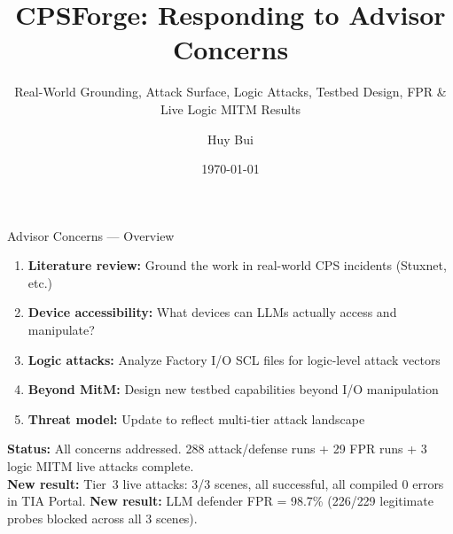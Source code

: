 \documentclass[aspectratio=169,10pt]{beamer}
\title{\textbf{CPSForge: Responding to Advisor Concerns}}
\subtitle{Real-World Grounding, Attack Surface, Logic Attacks, Testbed Design, FPR \& Live Logic MITM Results}
\author{Huy Bui}
\date{\today}
\begin{document}
\begin{frame}
\titlepage
\end{frame}

\begin{frame}{Advisor Concerns — Overview}
\begin{enumerate}
    \item \textbf{Literature review:} Ground the work in real-world CPS incidents (Stuxnet, etc.)
    \item \textbf{Device accessibility:} What devices can LLMs actually access and manipulate?
    \item \textbf{Logic attacks:} Analyze Factory I/O SCL files for logic-level attack vectors
    \item \textbf{Beyond MitM:} Design new testbed capabilities beyond I/O manipulation
    \item \textbf{Threat model:} Update to reflect multi-tier attack landscape
\end{enumerate}

\vspace{0.5em}
\textbf{Status:} All concerns addressed. 288 attack/defense runs + 29 FPR runs + 3 logic MITM live attacks complete.\\  
\textbf{New result:} Tier~3 live attacks: 3/3 scenes, all successful, all compiled 0 errors in TIA Portal.
\textbf{New result:} LLM defender FPR = 98.7\% (226/229 legitimate probes blocked across all 3 scenes).
\end{frame}
\end{document}

